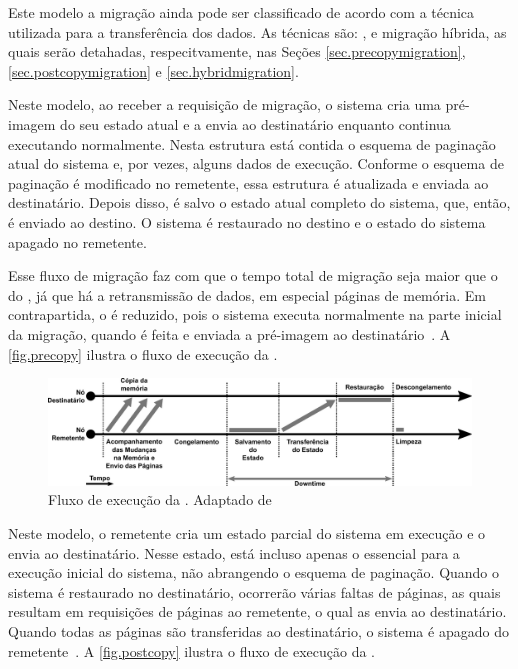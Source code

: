 Este modelo a migração ainda pode ser classificado de acordo com a técnica utilizada para a transferência dos dados. As técnicas são: \precopymigration, \postcopymigration e migração híbrida, as quais serão detahadas, respecitvamente, nas Seções \ref{sec.precopymigration}, \ref{sec.postcopymigration} e \ref{sec.hybridmigration}.

\subsubsubsection{\Precopymigration}\label{sec.precopymigration}
Neste modelo, ao receber a requisição de migração, o sistema cria uma pré-imagem do seu estado atual e a envia ao destinatário enquanto continua executando normalmente. Nesta estrutura está contida o esquema de paginação atual do sistema e, por vezes, alguns dados de execução. Conforme o esquema de paginação é modificado no remetente, essa estrutura é atualizada e enviada ao destinatário. Depois disso, é salvo o estado atual completo do sistema, que, então, é enviado ao destino. O sistema é restaurado no destino e o estado do sistema apagado no remetente. 

Esse fluxo de migração faz com que o tempo total de migração seja maior que o do \coldmigration, já que há a retransmissão de dados, em especial páginas de memória. Em contrapartida, o \downtime é reduzido, pois o sistema executa normalmente na parte inicial da migração, quando é feita e enviada a pré-imagem ao destinatário~\cite{singh2022predictive, imran2022live}. A \autoref{fig.precopy} ilustra o fluxo de execução da \precopymigration.

\begin{figure}[bt]
    \centering
    \includegraphics[width=0.8\linewidth]{content/images/pre-copy-migration-flow.pdf}
    \caption{Fluxo de execução da \precopymigration. Adaptado de~\cite{migrationimages}}
    \label{fig.precopy}
\end{figure}

\subsubsubsection{\Postcopymigration}\label{sec.postcopymigration}
Neste modelo, o remetente cria um estado parcial do sistema em execução e o envia ao destinatário. Nesse estado, está incluso apenas o essencial para a execução inicial do sistema, não abrangendo o esquema de paginação. Quando o sistema é restaurado no destinatário, ocorrerão várias faltas de páginas, as quais resultam em requisições de páginas ao remetente, o qual as envia ao destinatário. Quando todas as páginas são transferidas ao destinatário, o sistema é apagado do remetente~\cite{singh2022predictive, imran2022live}. A \autoref{fig.postcopy} ilustra o fluxo de execução da \postcopymigration.

